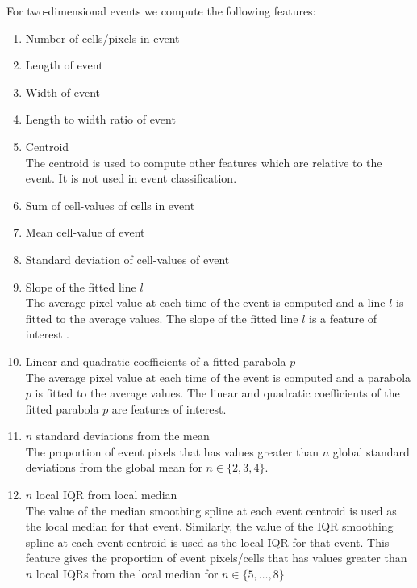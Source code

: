 \documentclass[a4paper,11pt]{article}
\begin{document}
For two-dimensional events we compute the following features:
\begin{enumerate}
	\item Number of cells/pixels in event
	\item Length of event
	\item Width of event
	\item Length to width ratio of event
	\item Centroid \\
	      The centroid is used to compute other features which are relative to the event. It is not used in event classification.
	\item Sum of cell-values of cells in event
	\item Mean cell-value of event
	\item Standard deviation of cell-values of event
	\item Slope of the fitted line $l$ \\
	      The average pixel value at each time of the event is computed and a line $l$ is fitted to the average values. The slope of the fitted line $l$ is a feature of interest .
	\item Linear and quadratic coefficients of a fitted parabola $p$ \\
	      The average pixel value at each time of the event is computed and a parabola $p$ is fitted to the average values. The linear and quadratic coefficients of the fitted parabola $p$ are features of interest.
	\item $n$ standard deviations from the mean \\
	      The proportion of event pixels that has values greater than $n$ global standard deviations from the global mean for $n \in \{2, 3, 4\}$.
	\item $n$ local IQR from local median \\
	      The value of the median smoothing spline at each event centroid is used as the local median for that event. Similarly, the value of the IQR smoothing spline at each event centroid is used as the local IQR for that event. This feature gives the proportion of event pixels/cells that has values greater than $n$ local IQRs from the local median for $n \in \{ 5, \dots, 8 \} $

\end{enumerate}
\end{document}
